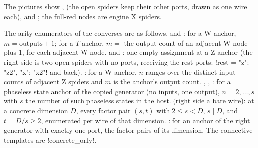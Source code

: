 \begin{center}
\end{center}
\noindent The pictures show ,  (the open spiders keep their other ports,
drawn as one wire each), and ; the full-red nodes are engine X spiders.

The arity enumerators of the converses are as follows.  and
: for a W anchor, $m=\text{outputs}+1$; for a $T$ anchor, $m=$ the output count
of an adjacent W node plus $1$, for each adjacent W node.  and :
one empty assignment at a Z anchor (the right side is two open spiders with no ports, receiving
the rest ports: \py!rest = {"z": "z2", "x": "x2"}! and back). : for a W anchor,
$n$ ranges over the distinct input counts of adjacent Z spiders and $m$ is the anchor's output
count. , , : for a phaseless state
anchor of the copied generator (no inputs, one output), $n=2,\dots,s$ with $s$ the number of such
phaseless states in the host.  (right side a bare wire): at a concrete
dimension $D$, every factor pair $(s,t)$ with $2\le s<D$, $s\mid D$, and $t=D/s\ge2$, enumerated
per wire of that dimension. : for an anchor of the right generator
with exactly one port, the factor pairs of its dimension. The connective templates are
\py!concrete_only!.

